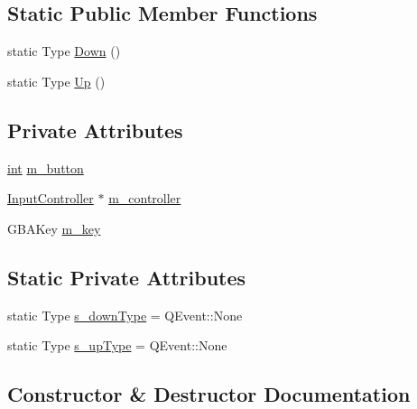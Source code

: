 \subsection*{Static Public Member Functions}
\begin{DoxyCompactItemize}
\item 
static Type \mbox{\hyperlink{class_q_g_b_a_1_1_gamepad_button_event_a95c6ffc6201926bd3f3feba985dcf2ec}{Down}} ()
\item 
static Type \mbox{\hyperlink{class_q_g_b_a_1_1_gamepad_button_event_a27a05c5199de66a176c87c9c3589b909}{Up}} ()
\end{DoxyCompactItemize}
\subsection*{Private Attributes}
\begin{DoxyCompactItemize}
\item 
\mbox{\hyperlink{ioapi_8h_a787fa3cf048117ba7123753c1e74fcd6}{int}} \mbox{\hyperlink{class_q_g_b_a_1_1_gamepad_button_event_a15552eaf205bb13dd21b430ab6b6d661}{m\+\_\+button}}
\item 
\mbox{\hyperlink{class_q_g_b_a_1_1_input_controller}{Input\+Controller}} $\ast$ \mbox{\hyperlink{class_q_g_b_a_1_1_gamepad_button_event_ae02970192c8d4c7a3eac248b2b1ac39a}{m\+\_\+controller}}
\item 
G\+B\+A\+Key \mbox{\hyperlink{class_q_g_b_a_1_1_gamepad_button_event_adca49fed399e6383b30f4e2f0e18f7c0}{m\+\_\+key}}
\end{DoxyCompactItemize}
\subsection*{Static Private Attributes}
\begin{DoxyCompactItemize}
\item 
static Type \mbox{\hyperlink{class_q_g_b_a_1_1_gamepad_button_event_af543500902b07c9e4c4ea2f8fd1103fc}{s\+\_\+down\+Type}} = Q\+Event\+::\+None
\item 
static Type \mbox{\hyperlink{class_q_g_b_a_1_1_gamepad_button_event_a65d02e8da94b30c3a2317d16a9f196d6}{s\+\_\+up\+Type}} = Q\+Event\+::\+None
\end{DoxyCompactItemize}


\subsection{Constructor \& Destructor Documentation}
\mbox{\label{class_q_g_b_a_1_1_gamepad_button_event_a5bc5f573023d767128bea16fc9284d41}} 
